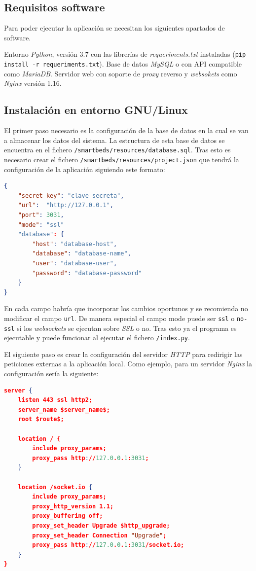 \subsection{Requisitos software}

Para poder ejecutar la aplicación se necesitan los siguientes apartados de software.

Entorno \textit{Python}, versión 3.7 con las librerías de \textit{requeriments.txt} instaladas (\texttt{pip install -r requeriments.txt}).
Base de datos \textit{MySQL} o con API compatible como \textit{MariaDB}. Servidor web con soporte de \textit{proxy} reverso y \textit{websokets} como \textit{Nginx} versión 1.16.

\subsection{Instalación en entorno GNU/Linux}

El primer paso necesario es la configuración de la base de datos en la cual se van a almacenar los datos del sistema. La estructura de esta base de datos se encuentra en el fichero \texttt{/smartbeds/resources/database.sql}. Tras esto es necesario crear el fichero \texttt{/smartbeds/resources/project.json} que tendrá la configuración de la aplicación siguiendo este formato:

\begin{lstlisting}[language=JSON]
{
	"secret-key": "clave secreta",
	"url":  "http://127.0.0.1",
	"port": 3031,
	"mode": "ssl"
	"database": {
		"host": "database-host",
		"database": "database-name",
		"user": "database-user",
		"password": "database-password"
	}
}
\end{lstlisting}

En cada campo habría que incorporar los cambios oportunos y se recomienda no modificar el campo \texttt{url}. De manera especial el campo mode puede ser \texttt{ssl} o \texttt{no-ssl} si los \textit{websockets} se ejecutan sobre \textit{SSL} o no. Tras esto ya el programa es ejecutable y puede funcionar al ejecutar el fichero \texttt{/index.py}.

El siguiente paso es crear la configuración del servidor \textit{HTTP} para redirigir las peticiones externas a la aplicación local. Como ejemplo, para un servidor \textit{Nginx} la configuración sería la siguiente:

\begin{lstlisting}[language=JSON]
server {
	listen 443 ssl http2;
	server_name $server_name$;
	root $route$;
	
	location / {
		include proxy_params;
		proxy_pass http://127.0.0.1:3031;
	}
	
	location /socket.io {
		include proxy_params;
		proxy_http_version 1.1;
		proxy_buffering off;
		proxy_set_header Upgrade $http_upgrade;
		proxy_set_header Connection "Upgrade";
		proxy_pass http://127.0.0.1:3031/socket.io;
	}
}
\end{lstlisting}

